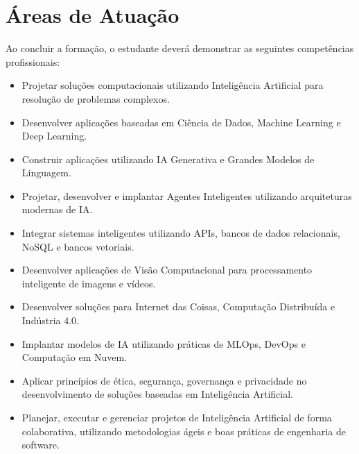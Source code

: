 \chapter{Áreas de Atuação}

Ao concluir a formação, o estudante deverá demonstrar as seguintes competências profissionais:

\begin{itemize}
    \item Projetar soluções computacionais utilizando Inteligência Artificial para resolução de problemas complexos.
    \item Desenvolver aplicações baseadas em Ciência de Dados, Machine Learning e Deep Learning.
    \item Construir aplicações utilizando IA Generativa e Grandes Modelos de Linguagem.
    \item Projetar, desenvolver e implantar Agentes Inteligentes utilizando arquiteturas modernas de IA.
    \item Integrar sistemas inteligentes utilizando APIs, bancos de dados relacionais, NoSQL e bancos vetoriais.
    \item Desenvolver aplicações de Visão Computacional para processamento inteligente de imagens e vídeos.
    \item Desenvolver soluções para Internet das Coisas, Computação Distribuída e Indústria 4.0.
    \item Implantar modelos de IA utilizando práticas de MLOps, DevOps e Computação em Nuvem.
    \item Aplicar princípios de ética, segurança, governança e privacidade no desenvolvimento de soluções baseadas em Inteligência Artificial.
    \item Planejar, executar e gerenciar projetos de Inteligência Artificial de forma colaborativa, utilizando metodologias ágeis e boas práticas de engenharia de software.
\end{itemize}
